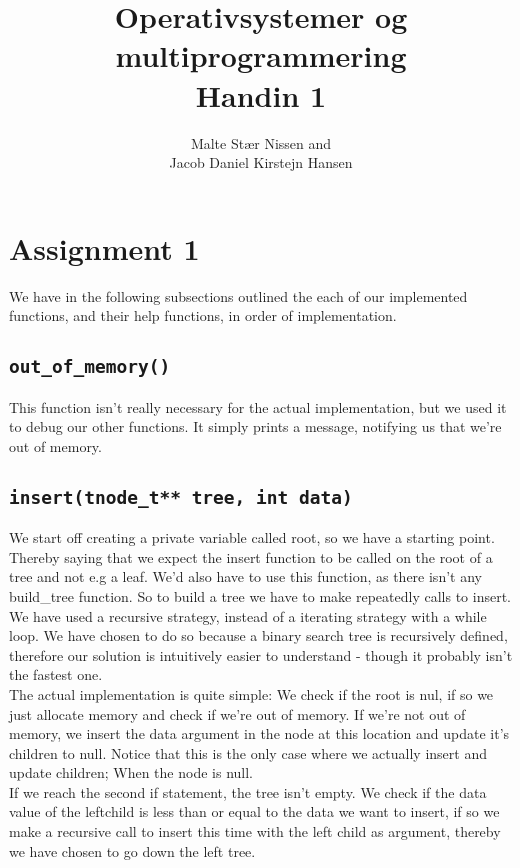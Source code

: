 \documentclass[11pt,a4paper]{article}
\title{Operativsystemer og multiprogrammering \\ Handin 1}
\author{Malte Stær Nissen and \\ 
        Jacob Daniel Kirstejn Hansen}
\begin{document}
\maketitle

\tableofcontents
\newpage

\section{Assignment 1}
We have in the following subsections outlined the each of our implemented
functions, and their help functions, in order of implementation.

\subsection{\texttt{out\_of\_memory()}}
This function isn't really necessary for the actual implementation, but we used
it to debug our other functions. It simply prints a message, notifying us that
we're out of memory. 

\subsection{\texttt{insert(tnode\_t** tree, int data)}}
We start off creating a private variable called root, so we have a starting
point. Thereby saying that we expect the insert function to be called on the
root of a tree and not e.g a leaf. We'd also have to use this function, as
there isn't any build\_tree function. So to build a tree we have to make
repeatedly calls to insert.\\

We have used a recursive strategy, instead of a iterating strategy with a while
loop. We have chosen to do so because a binary search tree is recursively
defined, therefore our solution is intuitively easier to understand - though it
probably isn't the fastest one.\\

The actual implementation is quite simple: We check if the root is nul, if so
we just allocate memory and check if we're out of memory. If we're not out of
memory, we insert the data argument in the node at this location and update
it's children to null. Notice that this is the only case where we actually
insert and update children; When the node is null.\\

If we reach the second if statement, the tree isn't empty. We check if the data
value of the leftchild is less than or equal to the data we want to insert, if
so we make a recursive call to insert this time with the left child as
argument, thereby we have chosen to go down the left tree.\\
\end{document}
